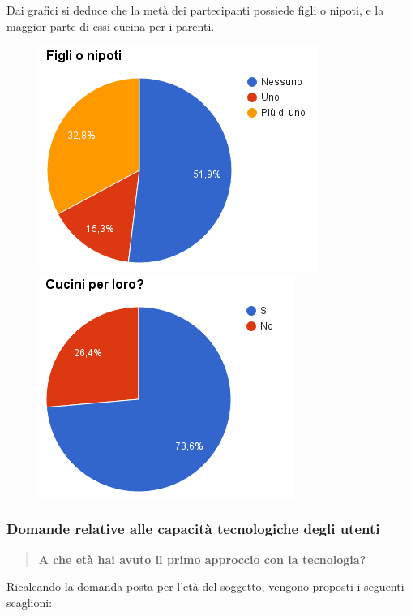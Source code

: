 Dai grafici si deduce che la metà dei partecipanti possiede figli o nipoti, e
la maggior parte di essi cucina per i parenti.
\begin{figure}[H]
\centering
\begin{minipage}{.48\textwidth}
	\includegraphics[scale=0.57]{img/chart_hai_figli_o_nipoti}
\end{minipage}
\hfill
\begin{minipage}{.49\textwidth}
	\includegraphics[scale=0.57]{img/chart_cucini_per_i_parenti}
\end{minipage}
\end{figure}

\subsubsection{Domande relative alle capacità tecnologiche degli utenti}
\begin{quote}
	\textbf{A che età hai avuto il primo approccio con la tecnologia?}
\end{quote}

Ricalcando la domanda posta per l'età del soggetto, vengono proposti i seguenti
scaglioni:

